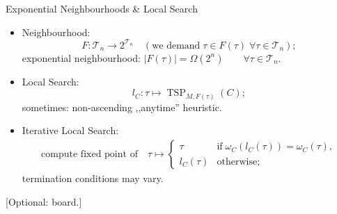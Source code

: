 \documentclass[
  size=8pt,
  style=klope,
  paper=screen,
  mode=present,
  nohandoutpagebreaks,
  pauseslide,
  hlsections,
  fleqn,
]{powerdot}
\def\board{{\color{green} [Optional: board.]}}
\begin{document}
\begin{slide}{Exponential Neighbourhoods \& Local Search}
\begin{itemize}
  \item
  Neighbourhood:
  \begin{equation}
    F: \mathcal{T}_n \to 2^{\mathcal{T}_n}
    \quad \left(\text{we demand}\; \tau \in F\left(\tau\right) \; \forall \tau \in \mathcal{T}_n\right);
  \end{equation}
  exponential neighbourhood:
  $\left\vert F(\tau) \right\vert = \Omega(2^n) \qquad \forall \tau \in \mathcal{T}_n$.
  \item
  Local Search:
  \begin{equation}
    l_C: \tau \mapsto \operatorname{TSP}_{M,F(\tau)}\left(C\right);
  \end{equation}
  sometimes: non-ascending ,,anytime'' heuristic.
  \item
  Iterative Local Search:
  \begin{align}
    \text{compute fixed point of}
    \quad
    \tau \mapsto
    \begin{cases}
      \tau \quad & \text{if} \; \omega_C\left(l_C\left(\tau\right)\right) = \omega_C\left(\tau\right),
      \\
      l_C\left(\tau\right) & \text{otherwise};
    \end{cases}
  \end{align}
  termination conditions may vary.
\end{itemize}
\board
\end{slide}
\end{document}
